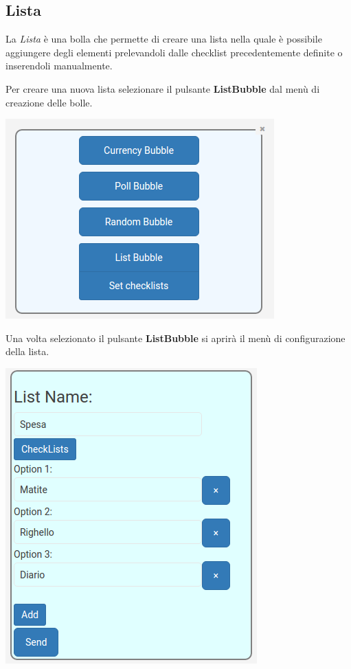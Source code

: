 \subsection{Lista}
\begin{flushleft}
La \textit{Lista} è una bolla che permette di creare una lista nella quale è possibile aggiungere degli elementi prelevandoli dalle checklist precedentemente definite o inserendoli manualmente.

Per creare una nuova lista selezionare il pulsante \textbf{ListBubble} dal menù di creazione delle bolle.\\
\begin{center}
\includegraphics[scale=0.75]{img/menu.png}
\end{center}
\newpage
Una volta selezionato il pulsante \textbf{ListBubble} si aprirà il menù di configurazione della lista.\\
\begin{center}
\includegraphics[scale=0.75]{img/list_conf.png}
\end{center}


\end{flushleft}
